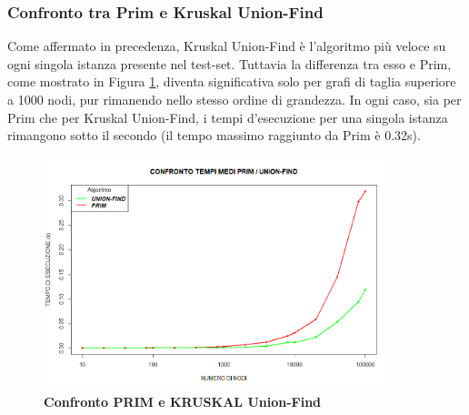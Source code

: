\documentclass[]{article}
\begin{document}
\begin{flushleft}
\subsubsection{Confronto tra Prim e Kruskal Union-Find}
Come affermato in precedenza, Kruskal Union-Find è l'algoritmo più veloce su ogni singola istanza presente nel test-set. Tuttavia la differenza tra esso e Prim, come mostrato in Figura \ref{prim-uf}, diventa significativa solo per grafi di taglia superiore a 1000 nodi, pur rimanendo nello stesso ordine di grandezza. In ogni caso, sia per Prim che per Kruskal Union-Find, i tempi d'esecuzione per una singola istanza rimangono sotto il secondo (il tempo massimo raggiunto da Prim è 0.32s).
\begin{figure}[h]
\centering
\includegraphics[width=0.9\textwidth,height=\textheight,keepaspectratio]{COMPARE_1.png}
\caption{\textbf{Confronto PRIM e KRUSKAL Union-Find}}
\label{prim-uf}
\end{figure}
\end{flushleft}
\end{document}

